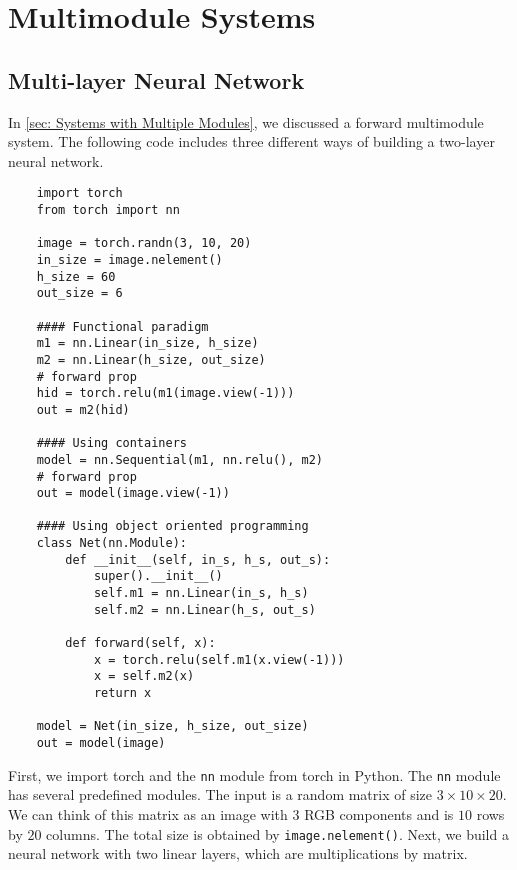 \chapter{Multimodule Systems}

\section{Multi-layer Neural Network}\label{sec: Multilayer Neural Network}

In \cref{sec: Systems with Multiple Modules}, we discussed a forward multimodule system.
The following code includes three different ways of building a two-layer neural network.

\begin{verbatim}
    import torch 
    from torch import nn
    
    image = torch.randn(3, 10, 20)
    in_size = image.nelement()
    h_size = 60
    out_size = 6
    
    #### Functional paradigm 
    m1 = nn.Linear(in_size, h_size)
    m2 = nn.Linear(h_size, out_size)
    # forward prop
    hid = torch.relu(m1(image.view(-1)))
    out = m2(hid)
    
    #### Using containers
    model = nn.Sequential(m1, nn.relu(), m2)
    # forward prop
    out = model(image.view(-1))
    
    #### Using object oriented programming 
    class Net(nn.Module):
        def __init__(self, in_s, h_s, out_s):
            super().__init__()
            self.m1 = nn.Linear(in_s, h_s)
            self.m2 = nn.Linear(h_s, out_s)
            
        def forward(self, x):
            x = torch.relu(self.m1(x.view(-1)))
            x = self.m2(x)
            return x
            
    model = Net(in_size, h_size, out_size)
    out = model(image)
\end{verbatim}

First, we import torch and the \texttt{nn} module from torch in Python.
The \texttt{nn} module has several predefined modules.
The input is a random matrix of size $3 \times 10 \times 20$.
We can think of this matrix as an image with $3$ RGB components and is $10$ rows by $20$ columns.
The total size is obtained by \texttt{image.nelement()}.
Next, we build a neural network with two linear layers, which are multiplications by matrix.

